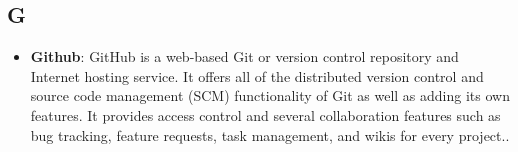\subsection*{G}
\begin{itemize}
	\item
	\textbf{Github}: GitHub is a web-based Git or version control repository and Internet hosting service. It offers all of the distributed version control and source code management (SCM) functionality of Git as well as adding its own features. It provides access control and several collaboration features such as bug tracking, feature requests, task management, and wikis for every project..
\end{itemize}
\newpage